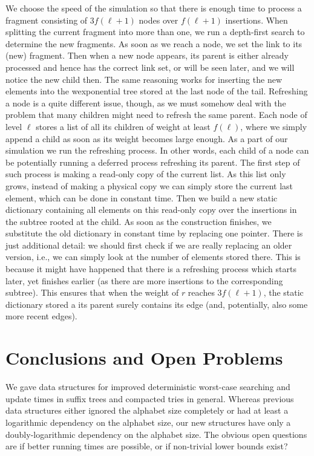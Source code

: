 \documentclass[11pt,onecolumn,final]{article} \usepackage{a4}
\theoremstyle{plain}
\theoremstyle{remark}
\begin{document}
We choose the speed of the simulation so that there is enough time to process a fragment consisting of $3f(\ell+1)$ nodes over $f(\ell+1)$ insertions. When splitting the current fragment into more than one, we run a depth-first search to determine the new fragments. As soon as we reach a node, we set the link to its (new) fragment. Then when a new node appears, its parent is either already processed and hence has the correct link set, or will be seen later, and we will notice the new child then. The same reasoning works for inserting the new elements into the wexponential tree stored at the last node of the tail. Refreshing a node is  a quite different issue, though, as we must somehow deal with the problem that many children might need to refresh the same parent. Each node of level $\ell$ stores a list of all its children of weight at least $f(\ell)$, where we simply append a child as soon as its weight becomes large enough. As a part of our simulation we run the refreshing process. In other words, each child of a node can be potentially running a deferred process refreshing its parent. The first step of such process is making a read-only copy of the current list. As this list only grows, instead of making a physical copy we can simply store the current last element, which can be done in constant time. Then we build a new static dictionary containing all elements on this read-only copy over the insertions in the subtree rooted at the child.  As soon as the construction finishes, we substitute the old dictionary in constant time by replacing one pointer. There is just additional detail: we should first check if we are really replacing an older version, i.e., we can simply look at the number of elements stored there. This is because it might have happened that there is a refreshing process which starts later, yet finishes earlier (as there are more insertions to the corresponding subtree). This ensures that when the weight of $r$ reaches $3f(\ell+1)$, the static dictionary stored a its parent surely contains its edge (and, potentially, also some more recent edges).

\section{Conclusions and Open Problems}
\label{sect:conclusions}
We gave data structures for improved deterministic worst-case searching and update times in suffix trees and compacted tries in general. Whereas previous data structures either ignored the alphabet size completely \cite{andersson07dynamic} or had at least a logarithmic dependency on the alphabet size, our new structures have only a doubly-logarithmic dependency on the alphabet size. The obvious open questions are if better running times are possible, or if non-trivial lower bounds exist?
\end{document}

